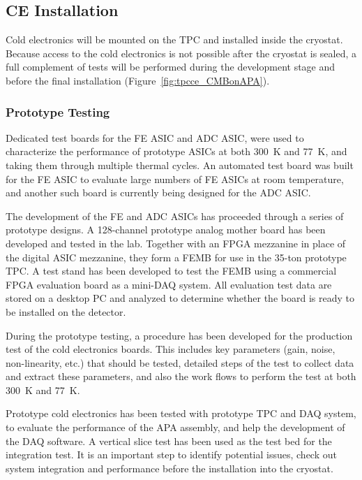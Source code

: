 %
\subsection{CE Installation}
\label{subsec:ce_install}

Cold electronics will be mounted on the TPC and installed inside the cryostat.
Because access to the cold electronics is not possible after the cryostat is sealed,
a full complement of tests will be performed during the development stage and before the final installation
(Figure~\ref{fig:tpcce_CMBonAPA}).

\subsubsection{Prototype Testing}
\label{subsubsec:ce_install_proto}

Dedicated test boards for the FE ASIC and ADC ASIC,
were used to characterize the performance of prototype ASICs at both 300~K and 77~K,
and taking them through multiple thermal cycles.
An automated test board was built for the FE ASIC to evaluate large numbers of FE ASICs at room temperature,
and another such board is currently being designed for the ADC ASIC.

The development of the FE and ADC ASICs has proceeded through a series of prototype designs.
A 128-channel prototype analog mother board has been developed and tested in the lab.
Together with an FPGA mezzanine in place of the digital ASIC mezzanine,
they form a FEMB for use in the 35-ton prototype TPC.
A test stand has been developed to test the FEMB
using a commercial FPGA evaluation board as a mini-DAQ system.
All evaluation test data are stored on a desktop PC and analyzed to
determine whether the board is ready to be installed on the detector.

During the prototype testing, a procedure has been developed for the production test of the cold electronics boards.
This includes key parameters (gain, noise, non-linearity, etc.) that should be tested,
detailed steps of the test to collect data and extract these parameters,
and also the work flows to perform the test at both 300~K and 77~K.

Prototype cold electronics has been tested with prototype TPC and DAQ system,
to evaluate the performance of the APA assembly, and help the development of the DAQ software.
A vertical slice test has been used as the test bed for the integration test.
It is an important step to identify potential issues, check out system integration and performance
before the installation into the cryostat.

